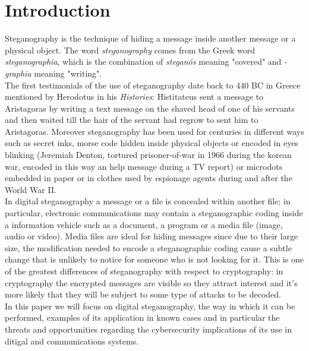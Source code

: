 \documentclass[../../main.tex]{subfiles}
\begin{document}
\section{Introduction}

Steganography is the technique of hiding a message inside another message or a physical object.
The word \textit{steganography} comes from the Greek word \textit{steganographia}, which is the combination of 
\textit{steganós} meaning "covered" and \textit{-graphia} meaning "writing".
\\
The first testimonials of the use of steganography date back to 440 BC in Greece mentioned by Herodotus in his
\emph{Histories}: Histitateus sent a message to Aristagoras by writing a text message on the shaved head of one of his
servants and then waited till the hair of the servant had regrow to sent him to Aristagoras.
Moreover steganography has been used for centuries in different ways such as secret inks, morse code hidden inside
physical objects or encoded in eyes blinking (Jeremiah Denton, tortured prisoner-of-war in 1966 during the korean
war, encoded in this way an help message during a TV report) or microdots embedded in paper or in clothes used by
espionage agents during and after the World War II.
\\
In digital steganography a message or a file is concealed within another file; in particular, electronic communications
may contain a steganographic coding inside a information vehicle such as a document, a program or a media file (image,
audio or video).
Media files are ideal for hiding messages since due to their large size, the modification needed to encode a
steganographic coding cause a subtle change that is unlikely to notice for someone who is not looking for it.
This is one of the greatest differences of steganography with respect to cryptography: in cryptography the encrypted
messages are visible so they attract interest and it's more likely that they will be subject to some type of attacks to
be decoded.
\\
In this paper we will focus on digital steganography, the way in which it can be performed, examples of its application
in known cases and in particular the threats and opportunities regarding the cybersecurity implications of its use in
ditigal and communications systems.

\pagebreak
\end{document}
